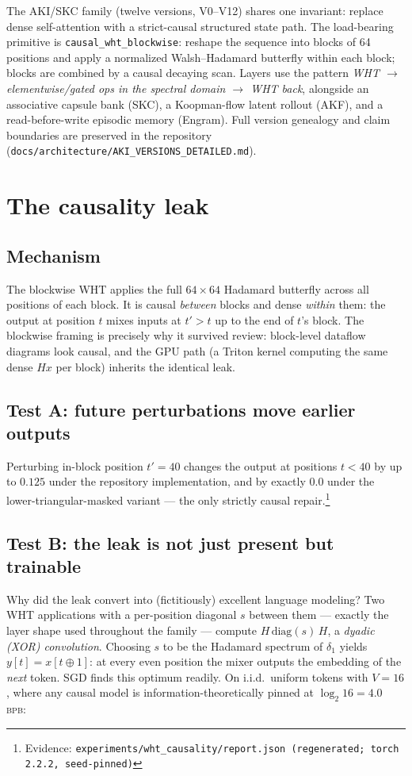 \documentclass[11pt]{article}
\newcommand{\bpb}{\textsc{bpb}}
\newcommand{\evid}[1]{\footnote{Evidence: \texttt{#1}}}
\begin{document}
The AKI/SKC family (twelve versions, V0--V12) shares one invariant: replace
dense self-attention with a strict-causal structured state path. The
load-bearing primitive is \texttt{causal\_wht\_blockwise}: reshape the sequence
into blocks of 64 positions and apply a normalized Walsh--Hadamard butterfly
within each block; blocks are combined by a causal decaying scan. Layers use
the pattern \emph{WHT $\to$ elementwise/gated ops in the spectral domain $\to$
WHT back}, alongside an associative capsule bank (SKC), a Koopman-flow latent
rollout (AKF), and a read-before-write episodic memory (Engram). Full version
genealogy and claim boundaries are preserved in the repository
(\texttt{docs/architecture/AKI\_VERSIONS\_DETAILED.md}).

\section{The causality leak}
\label{sec:leak}

\subsection{Mechanism}
The blockwise WHT applies the full $64\times64$ Hadamard butterfly across all
positions of each block. It is causal \emph{between} blocks and dense
\emph{within} them: the output at position $t$ mixes inputs at $t' > t$ up to
the end of $t$'s block. The blockwise framing is precisely why it survived
review: block-level dataflow diagrams look causal, and the GPU path (a Triton
kernel computing the same dense $H x$ per block) inherits the identical leak.

\subsection{Test A: future perturbations move earlier outputs}
Perturbing in-block position $t'{=}40$ changes the output at positions
$t<40$ by up to $0.125$ under the repository implementation, and by exactly
$0.0$ under the lower-triangular-masked variant --- the only strictly causal
repair.\evid{experiments/wht\_causality/report.json (regenerated; torch 2.2.2,
seed-pinned)}

\subsection{Test B: the leak is not just present but trainable}
\label{sec:testb}
Why did the leak convert into (fictitiously) excellent language modeling?
Two WHT applications with a per-position diagonal $s$ between them ---
exactly the layer shape used throughout the family --- compute
$H\,\mathrm{diag}(s)\,H$, a \emph{dyadic (XOR) convolution}. Choosing $s$ to
be the Hadamard spectrum of $\delta_1$ yields $y[t] = x[t \oplus 1]$: at every
even position the mixer outputs the embedding of the \emph{next} token. SGD
finds this optimum readily. On i.i.d.\ uniform tokens with $V{=}16$, where any
causal model is information-theoretically pinned at $\log_2 16 = 4.0$ \bpb:
\end{document}
